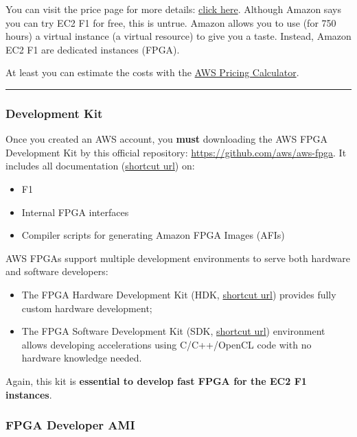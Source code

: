 \documentclass[a4paper]{article}
\newcommand{\longline}{\noindent\rule{\textwidth}{0.4pt}}
\begin{document}
    \noindent
    You can visit the price page for more details: \href{https://aws.amazon.com/ec2/pricing/}{click here}. Although Amazon says you can try EC2 F1 for free, this is untrue. Amazon allows you to use (for 750 hours) a virtual instance (a virtual resource) to give you a taste. Instead, Amazon EC2 F1 are dedicated instances (FPGA).\newline

    \noindent
    At least you can estimate the costs with the \href{https://calculator.aws/#/createCalculator/ec2-enhancement}{AWS Pricing Calculator}.

    \longline

    \subsubsection{Development Kit}\label{sec: development kit}

    Once you created an AWS account, you \textbf{must} downloading the AWS FPGA Development Kit by this official repository: \url{https://github.com/aws/aws-fpga}. It includes all documentation (\href{https://github.com/aws/aws-fpga#documentation-overview}{shortcut url}) on:
    \begin{itemize}
        \item F1
        \item Internal FPGA interfaces
        \item Compiler scripts for generating Amazon FPGA Images (AFIs)
    \end{itemize}
    
    \noindent
    AWS FPGAs support multiple development environments to serve both hardware and software developers:
    \begin{itemize}
        \item The FPGA Hardware Development Kit (HDK, \href{https://github.com/aws/aws-fpga#hardware-development-kit-hdk}{shortcut url}) provides fully custom hardware development;

        \item The FPGA Software Development Kit (SDK, \href{https://github.com/aws/aws-fpga#runtime-tools-sdk}{shortcut url}) environment allows developing accelerations using C/C++/OpenCL code with no hardware knowledge needed.
    \end{itemize}
    Again, this kit is \textbf{essential to develop fast FPGA for the EC2 F1 instances}.\newpage

    \subsubsection{FPGA Developer AMI}\label{sec: FPGA Developer AMI}
\end{document}
